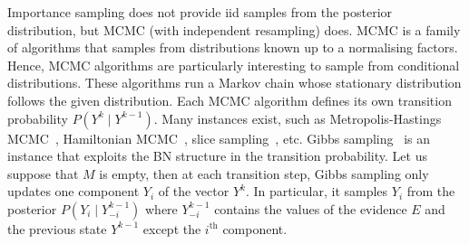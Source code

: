 Importance sampling does not provide iid samples from the posterior distribution, but MCMC (with independent resampling) does. MCMC is a family of algorithms that samples from distributions known up to a normalising factors. Hence, MCMC algorithms are particularly interesting to sample from conditional distributions. These algorithms run a Markov chain whose stationary distribution follows the given distribution. Each MCMC algorithm defines its own transition probability $P(Y^k\mid Y^{k-1})$. Many instances exist, such as Metropolis-Hastings MCMC~\citep{hastings1970monte}, Hamiltonian MCMC~\citep{neal2011mcmc}, slice sampling~\citep{neal2003slice}, etc. Gibbs sampling~\citep{sorensen1995bayesian} is an instance that exploits the BN structure in the transition probability. Let us suppose that $M$ is empty, then at each transition step, Gibbs sampling only updates one component $Y_i$ of the vector $Y^k$. In particular, it samples $Y_i$ from the posterior $P(Y_i\mid Y_{-i}^{k-1})$ where $Y_{-i}^{k-1}$ contains the values of the evidence $E$ and the previous state $Y^{k-1}$ except the $i^{\text{th}}$ component.


